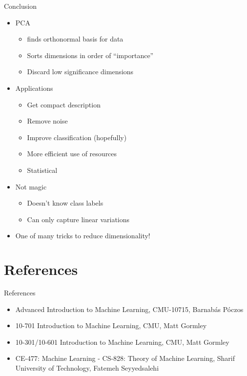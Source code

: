 \documentclass[serif, aspectratio=169]{beamer}
\begin{document}
\begin{frame}{Conclusion}
    \begin{itemize}
        \item PCA 
        \begin{itemize}
            \item finds orthonormal basis for data
            \item Sorts dimensions in order of “importance”
            \item Discard low significance dimensions
        \end{itemize}
        \item Applications
        \begin{itemize}
            \item Get compact description
            \item Remove noise
            \item Improve classification (hopefully)
            \item More efficient use of resources
            \item Statistical
        \end{itemize}
        \item Not magic
        \begin{itemize}
            \item  Doesn’t know class labels
            \item Can only capture linear variations
        \end{itemize}
        \item One of many tricks to reduce dimensionality!
    \end{itemize}
\end{frame}

\section{References}

\begin{frame}{References}
    \begin{itemize}
        \item Advanced Introduction to Machine Learning, CMU-10715, Barnabás Póczos
        \item 10-701 Introduction to Machine Learning, CMU, Matt Gormley	
        \item 10-301/10-601 Introduction to Machine Learning, CMU, Matt	Gormley	
        \item CE-477: Machine Learning - CS-828: Theory of Machine Learning, Sharif University of Technology, Fatemeh Seyyedsalehi
    \end{itemize}
\end{frame}
\end{document}
